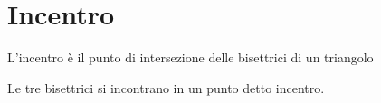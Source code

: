 \section{Incentro}\label{sec:incentro}
\begin{defn}[Incentro]\label{defn:incentro1}
L'incentro è il punto di intersezione delle bisettrici di un triangolo
\end{defn}
\begin{thm}[Incentro]\label{thm:incentro1}
	Le tre bisettrici si incontrano in un punto detto incentro.
\end{thm}

